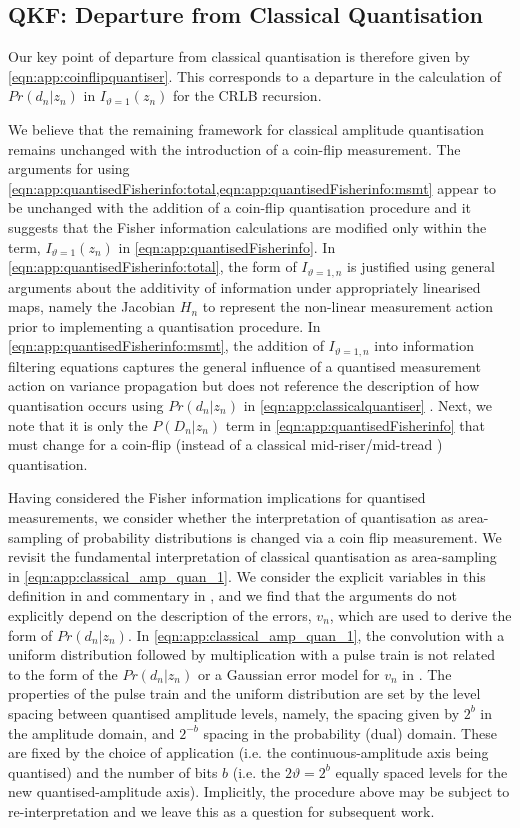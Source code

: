 \subsection{QKF: Departure from Classical Quantisation}

Our key point of departure from classical quantisation is therefore given by \cref{eqn:app:coinflipquantiser}. This corresponds to a departure in the calculation of $Pr(d_n | z_n)$ in $I_{\vartheta=1}(z_n)$ for the CRLB recursion.

We believe that the remaining framework for classical amplitude quantisation remains unchanged with the introduction of a coin-flip measurement. The arguments for using \cref{eqn:app:quantisedFisherinfo:total,eqn:app:quantisedFisherinfo:msmt} appear to be unchanged with the addition of a coin-flip quantisation procedure and it suggests that the Fisher information calculations are modified only within the term, $I_{\vartheta=1}(z_n)$ in \cref{eqn:app:quantisedFisherinfo}.  In \cref{eqn:app:quantisedFisherinfo:total}, the form of  $I_{\vartheta=1, n}$ is justified using general arguments about the additivity of information under appropriately linearised maps, namely the Jacobian $H_n$ to represent the non-linear measurement action prior to implementing a quantisation procedure. In \cref{eqn:app:quantisedFisherinfo:msmt}, the addition of $I_{\vartheta=1, n}$ into information filtering equations captures the general influence of a quantised measurement action on variance propagation but does not reference the description of how quantisation occurs using $Pr(d_n|z_n)$ in \cref{eqn:app:classicalquantiser} \cite{karlsson2005}. Next, we note that it is only the $P(D_n|z_n)$ term in \cref{eqn:app:quantisedFisherinfo} that must change for a coin-flip (instead of a classical mid-riser/mid-tread ) quantisation.

Having considered the Fisher information implications for quantised measurements, we consider whether the interpretation of quantisation as area-sampling of probability distributions is changed via a coin flip measurement. We revisit the fundamental interpretation of classical quantisation as area-sampling in \cref{eqn:app:classical_amp_quan_1}. We consider the explicit variables in this definition in \cite{widrow1996} and commentary in \cite{karlsson2005}, and we find that the arguments do not explicitly depend on the description of the errors, $v_n$, which are used to derive the form of $Pr(d_n|z_n)$. In \cref{eqn:app:classical_amp_quan_1}, the convolution with a uniform distribution followed by multiplication with a pulse train is not related to the form of the  $Pr(d_n| z_n)$ or a Gaussian error model for $v_n$ in \cite{karlsson2005}. The properties of the pulse train and the uniform distribution are set by the level spacing between quantised amplitude levels, namely, the spacing given by $2^b$ in the amplitude domain, and $2^{-b}$ spacing in the probability (dual) domain. These are fixed by the choice of application (i.e. the continuous-amplitude axis being quantised) and the number of bits $b$ (i.e. the $2\vartheta=2^b$ equally spaced levels for the new quantised-amplitude axis).  Implicitly, the procedure above may be subject to re-interpretation and we leave this as a question for subsequent work. 

